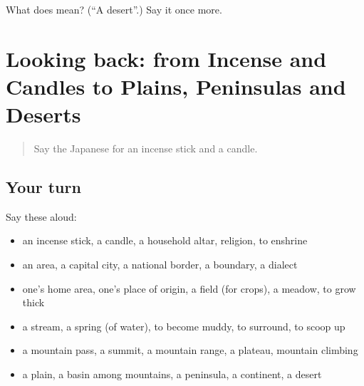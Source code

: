 \begin{tcolorbox}[breakable,colback=teal!4,colframe=teal!35!black,title={Before you move on}]
What does  mean? (\textquotedblleft{}A desert\textquotedblright{}.) Say it once more.
\end{tcolorbox}
\section[(dialogue)]{Looking back: from Incense and Candles to Plains, Peninsulas and Deserts}

\label{lesson:JA-R413-review-408-413}



\begin{quote}
Say the Japanese for an incense stick and a candle.
\end{quote}

\subsection*{Your turn}
Say these aloud:

\begin{itemize}
\raggedright
  \item an incense stick, a candle, a household altar, religion, to enshrine
  \item an area, a capital city, a national border, a boundary, a dialect
  \item one's home area, one's place of origin, a field (for crops), a meadow, to grow thick
  \item a stream, a spring (of water), to become muddy, to surround, to scoop up
  \item a mountain pass, a summit, a mountain range, a plateau, mountain climbing
  \item a plain, a basin among mountains, a peninsula, a continent, a desert
\end{itemize}

